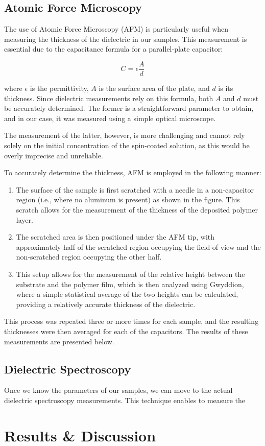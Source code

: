 \section{Atomic Force Microscopy}

The use of Atomic Force Microscopy (AFM) is particularly useful when measuring the thickness of the dielectric in our samples. This measurement is essential due to the capacitance formula for a parallel-plate capacitor:

\[
C = \epsilon \frac{A}{d}
\]

where $\epsilon$ is the permittivity, $A$ is the surface area of the plate, and $d$ is its thickness. Since dielectric measurements rely on this formula, both $A$ and $d$ must be accurately determined. The former is a straightforward parameter to obtain, and in our case, it was measured using a simple optical microscope. %


The measurement of the latter, however, is more challenging and cannot rely solely on the initial concentration of the spin-coated solution, as this would be overly imprecise and unreliable.

To accurately determine the thickness, AFM is employed in the following manner:
\begin{enumerate}
    \item The surface of the sample is first scratched with a needle in a non-capacitor region (i.e., where no aluminum is present) as shown in the figure. This scratch allows for the measurement of the thickness of the deposited polymer layer. %
    \item The scratched area is then positioned under the AFM tip, with approximately half of the scratched region occupying the field of view and the non-scratched region occupying the other half.
    \item This setup allows for the measurement of the relative height between the substrate and the polymer film, which is then analyzed using Gwyddion, %
where a simple statistical average of the two heights can be calculated, providing a relatively accurate thickness of the dielectric.
\end{enumerate}

This process was repeated three or more times for each sample, and the resulting thicknesses were then averaged for each of the capacitors. The results of these measurements are presented below.

\section{Dielectric Spectroscopy}
Once we know the parameters of our samples, we can move to the actual dielectric spectroscopy measurements.
This technique enables to measure the

\chapter{Results \& Discussion}
